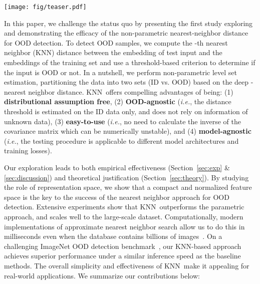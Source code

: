 \documentclass[nohyperref]{article}
\newcommand{\method}{{KNN}}
\theoremstyle{plain}
\theoremstyle{definition}
\theoremstyle{remark}
\begin{document}
\begin{figure*}[t]
\centering
\texttt{[image: fig/teaser.pdf]}
\caption{\small Illustration of our framework using nearest neighbors for OOD detection. \method performs non-parametric level set estimation, partitioning the data into two sets (ID vs. OOD) based on the -th nearest neighbor distance. The distances are estimated from the penultimate feature embeddings, visualized via UMAP~\cite{mcinnes2018umap-software}.
Models are trained on ResNet-18~\cite{he2016identity} using cross-entropy loss (left) v.s. contrastive loss (right). The in-distribution data is CIFAR-10 (colored in non-gray colors) and  OOD data is LSUN (colored in gray). The shaded grey area in the density distribution plot indicates OOD samples that are misidentified as ID data. }
\label{fig:umap}
\end{figure*}


In this paper, {we challenge the status quo by presenting the first study exploring and demonstrating the efficacy of the non-parametric nearest-neighbor distance for OOD detection}. To detect OOD samples, we compute the  -th nearest neighbor (KNN) distance between the embedding of test input and the embeddings of the training set and use
a threshold-based criterion to determine if the input
is OOD or not. In a nutshell, we perform non-parametric level set estimation, partitioning the data into two sets (ID vs. OOD) based on the deep -nearest neighbor distance.  \method~offers compelling advantages of being: (1) \textbf{distributional assumption free}, (2) \textbf{OOD-agnostic} (\emph{i.e.}, the distance threshold is estimated on the ID data only, and does not rely on information of unknown data),  (3) \textbf{easy-to-use} (\emph{i.e.}, no need to calculate the inverse of the covariance matrix which can be numerically unstable), and (4) \textbf{model-agnostic} (\emph{i.e.}, the testing procedure is applicable to different model architectures and training losses).

Our exploration leads to both empirical effectiveness (Section~\ref{sec:exp} \& \ref{sec:discussion}) and theoretical justification (Section~\ref{sec:theory}). By studying the role of representation space, we show that a compact and normalized feature space is the key to the success of the nearest neighbor approach for OOD detection.  Extensive experiments show that \method~outperforms the parametric approach, and scales well to the large-scale dataset. Computationally, modern implementations of approximate nearest neighbor
search allow us to do this in milliseconds even when the database contains billions of images~\citep{faiss}. On a challenging ImageNet OOD detection benchmark~\cite{huang2021mos}, our KNN-based approach achieves superior performance under a similar inference speed as the baseline methods. The overall simplicity and effectiveness of \method~make it appealing for real-world applications. 
We summarize our contributions below:  
\end{document}

